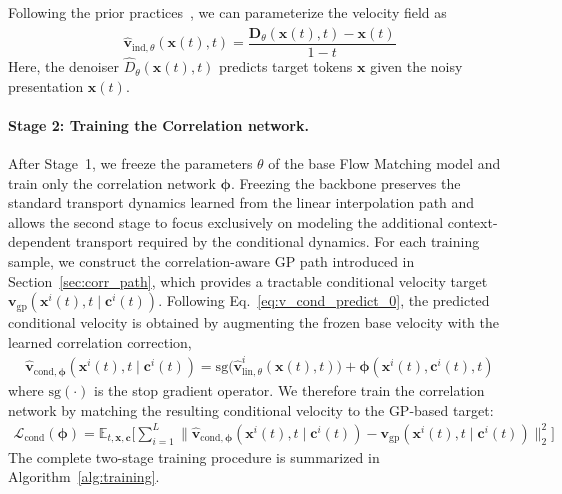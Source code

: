 \documentclass{article} %
\begin{document}
Following the prior practices~\citep{li2026basicsletdenoisinggenerative, roos2026categoricalflowmaps, lee2026flowmaplanguagemodels},  we can parameterize the velocity field as 
\begin{equation}
    \hat{\mathbf{v}}_{\text{ind}, \theta}(\mathbf{x}(t), t) = \frac{\hat{\mathbf{D}}_{\theta}(\mathbf{x}(t), t) - \mathbf{x}(t)}{1-t}
\end{equation}
Here, the denoiser $\hat{D}_{\theta}(\mathbf{x}(t), t)$ predicts target tokens $\mathbf{x}$ given the noisy presentation $\mathbf{x}(t)$.

\paragraph{Stage 2: Training the Correlation network.} After Stage~1, we freeze the parameters $\theta$ of the base Flow Matching model and train only the correlation network $\boldsymbol{\phi}$. Freezing the backbone preserves the standard transport dynamics learned from the linear interpolation path and allows the second stage to focus exclusively on modeling the additional context-dependent transport required by the conditional dynamics. For each training sample, we construct the correlation-aware GP path introduced in Section~\ref{sec:corr_path}, which provides a tractable conditional velocity target $\mathbf{v}_{\text{gp}}(\mathbf{x}^{i}(t),t\mid\mathbf{c}^{i}(t))$. Following Eq.~\ref{eq:v_cond_predict_0}, the predicted conditional velocity is obtained by augmenting the frozen base velocity with the learned correlation correction,
\begin{eqnarray}
    \hat{\mathbf{v}}_{\text{cond}, \boldsymbol{\phi}} (\mathbf{x}^i(t),t  \mid \mathbf{c}^{i}(t)) = \text{sg}\Big(\hat{\mathbf{v}}^{i}_{\text{lin},\theta} (\mathbf{x}(t), t) \Big) + \boldsymbol{\phi}(\mathbf{x}^i(t), \mathbf{c}^i(t) ,t) \label{eq:v_cond_predict_1}
\end{eqnarray}
where $\text{sg}(\cdot)$ is the stop gradient operator. We therefore train the correlation network by matching the resulting conditional velocity to the GP-based target:
\begin{eqnarray}
    \mathcal{L}_{\text{cond}}(\boldsymbol{\phi}) =\mathbb{E}_{t, \mathbf{x}, \mathbf{c}} \Big[\sum_{i=1}^{L} \| \hat{\mathbf{v}}_{\text{cond}, \boldsymbol{\phi}} (\mathbf{x}^i(t),t  \mid \mathbf{c}^{i}(t)) - \mathbf{v}_{\mathrm{gp}}(\mathbf{x}^i(t), t \mid \mathbf{c}^i(t))\|^2_2\Big] 
\end{eqnarray}
The complete two-stage training procedure is summarized in Algorithm~\ref{alg:training}.
\end{document}
